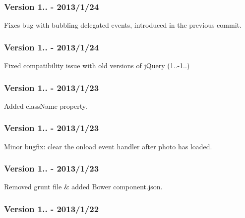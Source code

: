 \subsubsection*{Version 1.. -\/ 2013/1/24}


\begin{DoxyItemize}
\item Fixes bug with bubbling delegated events, introduced in the previous commit.
\end{DoxyItemize}

\subsubsection*{Version 1.. -\/ 2013/1/24}


\begin{DoxyItemize}
\item Fixed compatibility issue with old versions of j\-Query (1..-\/1..)
\end{DoxyItemize}

\subsubsection*{Version 1.. -\/ 2013/1/23}


\begin{DoxyItemize}
\item Added class\-Name property.
\end{DoxyItemize}

\subsubsection*{Version 1.. -\/ 2013/1/23}


\begin{DoxyItemize}
\item Minor bugfix\-: clear the onload event handler after photo has loaded.
\end{DoxyItemize}

\subsubsection*{Version 1.. -\/ 2013/1/23}


\begin{DoxyItemize}
\item Removed grunt file \& added Bower component.\-json.
\end{DoxyItemize}

\subsubsection*{Version 1.. -\/ 2013/1/22}


